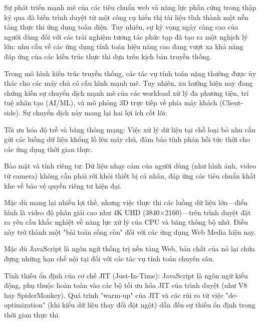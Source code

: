 

Sự phát triển mạnh mẽ của các tiêu chuẩn web và năng lực phần cứng trong thập kỷ qua đã biến trình duyệt từ một công cụ hiển thị tài liệu tĩnh thành một nền tảng thực thi ứng dụng toàn diện. Tuy nhiên, sự kỳ vọng ngày càng cao của người dùng đối với các trải nghiệm tương tác phức tạp đã tạo ra một nghịch lý lớn: nhu cầu về các ứng dụng tính toán hiệu năng cao đang vượt xa khả năng đáp ứng của các kiến trúc thực thi dựa trên kịch bản truyền thống.



Trong mô hình kiến trúc truyền thống, các tác vụ tính toán nặng thường được ủy thác cho các máy chủ có cấu hình mạnh mẽ. Tuy nhiên, xu hướng hiện nay đang chứng kiến sự chuyển dịch mạnh mẽ của các workload xử lý đa phương tiện, trí tuệ nhân tạo (AI/ML), và mô phỏng 3D trực tiếp về phía máy khách (Client-side). Sự chuyển dịch này mang lại hai lợi ích cốt lõi:


Tối ưu hóa độ trễ và băng thông mạng: Việc xử lý dữ liệu tại chỗ loại bỏ nhu cầu gửi các luồng dữ liệu khổng lồ lên máy chủ, đảm bảo tính phản hồi tức thời cho các ứng dụng thời gian thực.


Bảo mật và tính riêng tư: Dữ liệu nhạy cảm của người dùng (như hình ảnh, video từ camera) không cần phải rời khỏi thiết bị cá nhân, đáp ứng các tiêu chuẩn khắt khe về bảo vệ quyền riêng tư hiện đại.


Mặc dù mang lại nhiều lợi thế, nhưng việc thực thi các luồng dữ liệu lớn—điển hình là video độ phân giải cao như 4K UHD (3840×2160)—trên trình duyệt đặt ra yêu cầu khắc nghiệt về năng lực xử lý của CPU và băng thông bộ nhớ. Điều này trở thành một "bài toán sống còn" đối với các ứng dụng Web Media hiện nay.



Mặc dù JavaScript là ngôn ngữ thống trị nền tảng Web, bản chất của nó lại chứa đựng những hạn chế nội tại đối với các tác vụ tính toán chuyên sâu.


Tính thiếu ổn định của cơ chế JIT (Just-In-Time): JavaScript là ngôn ngữ kiểu động, phụ thuộc hoàn toàn vào các bộ tối ưu hóa JIT của trình duyệt (như V8 hay SpiderMonkey). Quá trình "warm-up" của JIT và các rủi ro từ việc "de-optimization" (khi kiểu dữ liệu thay đổi đột ngột) dẫn đến sự thiếu ổn định trong thời gian thực thi.


